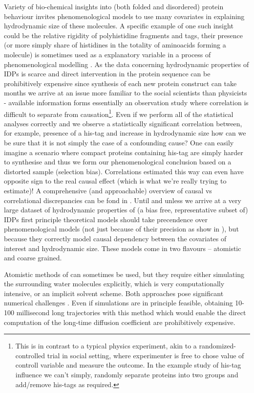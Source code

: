 \documentclass{doctoral}
\begin{document}
Variety of bio-chemical insights into (both folded and disordered) protein behaviour invites phenomenological models to use many covariates in explaining hydrodynamic size of these molecules. A specific example of one such insight could be the relative rigidity of polyhistidine fragments and tags, their presence (or more simply share of histidines in the totality of aminoacids forming a molecule) is sometimes used as a explanatory variable in a process of phenomenological modelling \cite{Tomasso_2016,Marsh_2010}. As the data concerning hydrodynamic properties of IDPs is scarce and direct intervention in the protein sequence can be prohibitively expensive since synthesis of each new protein construct can take months we arrive at an issue more familiar to the social scientists than physicists - available information forms essentially an observation study where correlation is difficult to separate from causation\footnote{This is in contrast to a typical physics experiment, akin to a randomized-controlled trial in social setting, where experimenter is free to chose value of controll variable and measure the outcome. In the example study of his-tag influence we can't simply, randomly separate proteins into two groups and add/remove his-tags as required.}. Even if we perform all of the statistical analyses correctly and we observe a statistically significant correlation between, for example, presence of a his-tag and increase in hydrodynamic size how can we be sure that it is not simply the case of a confounding cause? One can easily imagine a scenario where compact proteins containing his-tag are simply harder to synthesise and thus we form our phenomenological conclusion based on a distorted sample (selection bias). Correlations estimated this way can even have opposite sign to the real causal effect (which is what we're really trying to estimate)! A comprehensive (and approachable) overview of causal vs correlational discrepancies can be fond in \textcite{Cinelli_2022}.
Until and unless we arrive at a very large dataset of hydrodynamic properties of (a bias free, representative subset of) IDPs first principle theoretical models should take precendence over phenomenological models (not just because of their precision as show in \textcite{Waszkiewicz_2024_mda}), but because they correctly model causal dependency between the covariates of interest and hydrodynamic size. These models come in two flavours -- atomistic and coarse grained. 

Atomistic methods of can sometimes be used\cite{Karplus_1990}, but they require either simulating the surrounding water molecules explicitly, which is very computationally intensive, or an implicit solvent scheme.  Both approaches pose significant numerical challenges \cite{Frenkel_2001}. Even if simulations are in principle feasible, obtaining 10-100 millisecond long trajectories with this method which would enable the direct computation of the long-time diffusion coefficient are prohibitively expensive.
\end{document}

